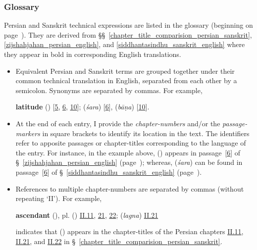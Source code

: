 \subsubsection*{Glossary} \label{format_glossary}
Persian and Sanskrit technical expressions are listed in the glossary (beginning on page~\pageref{acronym}). They are derived from  \S\S~\ref{chapter_title_comparision_persian_sanskrit}, \ref{zijshahjahan_persian_english}, and \ref{siddhantasindhu_sanskrit_english} where they appear in bold in corresponding English translations. 
\begin{itemize}[topsep=0pt]
    \item Equivalent Persian and Sanskrit terms are grouped together under their common technical translation in English, separated from each other by a semicolon. Synonyms are separated by commas. For example, 
    {\par\centering\textbf{latitude}\quad {}  (\ard) [\hyperlink{PEpass5}{5}, \hyperlink{PEpass6}{6}, \hyperlink{PEpass10}{10}];  (\textit{śara}) [\hyperlink{SEpass6}{6}],  (\textit{bāṇa}) [\hyperlink{SEpass10}{10}].\par}
    \item At the end of each entry, I provide the \textit{chapter-numbers} and/or the \textit{passage-markers} in square brackets to identify its location in the text. The identifiers refer to apposite passages or chapter-titles corresponding to the language of the entry. For instance, in the example above,   (\ard) appears in passage~[\hyperlink{PEpass6}{6}] of \S~\ref{zijshahjahan_persian_english} (page~\pageref{passge_6_ard_glossary_format_example}); whereas,  (\textit{śara}) can be found in passage~[\hyperlink{SEpass6}{6}] of \S~\ref{siddhantasindhu_sanskrit_english} (page~\pageref{passge_6_sara_glossary_format_example}).     \item References to multiple chapter-numbers are separated by commas (without repeating `II'). For example,
    {\par\centering
    \textbf{ascendant}\quad {} (\tali), pl.\thinspace {} (\tawali) \hyperlink{Pii11}{II.11}, \hyperlink{Pii21}{21}, \hyperlink{Pii22}{22};  (\textit{lagna}) \hyperlink{Sii21}{II.21}\par}
    indicates that  (\tawali) appears in the chapter-titles of the Persian chapters \hyperlink{Pii11}{II.11}, \hyperlink{Pii21}{II.21}, and \hyperlink{Pii22}{II.22} in \S~\ref{chapter_title_comparision_persian_sanskrit}. 

\end{itemize}
